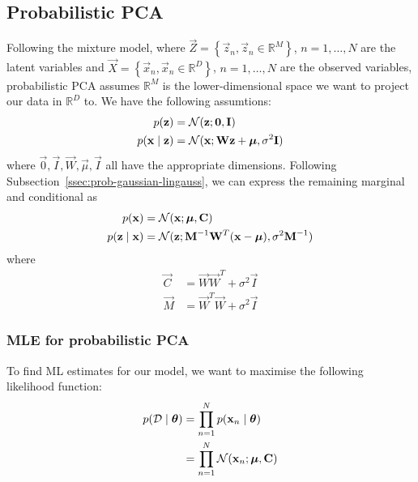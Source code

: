 \subsection{Probabilistic PCA}
Following the mixture model, where $\vec Z = \left\{\vec z_n, \vec z_n \in \mathbb R^M\right\}$, $n = 1, \dotsc, N$ are the latent variables and $\vec X = \left\{\vec x_n, \vec x_n \in \mathbb R^D\right\}$, $n = 1, \dotsc, N$ are the observed variables, probabilistic PCA assumes $\mathbb R^M$ is the lower-dimensional space we want to project our data in $\mathbb R^D$ to. We have the following assumtions:
\begin{align*}
    p(\boldsymbol{\mathbf{z}})               &= \operatorname{\mathcal N}(\boldsymbol{\mathbf{z}}; \boldsymbol{\mathbf{0}}, \boldsymbol{\mathbf{I}}) \\
    p(\boldsymbol{\mathbf{x}} \mid \boldsymbol{\mathbf{z}})   &= \operatorname{\mathcal N}(\boldsymbol{\mathbf{x}}; \boldsymbol{\mathbf{W}} \boldsymbol{\mathbf{z}} + \boldsymbol{\mathbf{\mu}}, \sigma^2 \boldsymbol{\mathbf{I}})
\end{align*}
where $\vec 0, \vec I, \vec W, \vec \mu, \vec I$ all have the appropriate dimensions. Following Subsection~\ref{ssec:prob-gaussian-lingauss}, we can express the remaining marginal and conditional as
\begin{align*}
    p(\boldsymbol{\mathbf{x}})               &= \operatorname{\mathcal N}(\boldsymbol{\mathbf{x}}; \boldsymbol{\mathbf{\mu}}, \boldsymbol{\mathbf{C}}) \\
    p(\boldsymbol{\mathbf{z}} \mid \boldsymbol{\mathbf{x}})   &= \operatorname{\mathcal N}(\boldsymbol{\mathbf{z}}; \boldsymbol{\mathbf{M}}^{-1} \boldsymbol{\mathbf{W}}^T (\boldsymbol{\mathbf{x}} - \boldsymbol{\mathbf{\mu}}), \sigma^2 \boldsymbol{\mathbf{M}}^{-1})
\end{align*}
where
\begin{align*}
    \vec C      &= \vec W \vec W^T + \sigma^2 \vec I \\
    \vec M      &= \vec W^T \vec W + \sigma^2 \vec I
\end{align*}

\subsubsection{MLE for probabilistic PCA}
To find ML estimates for our model, we want to maximise the following likelihood function:
\begin{align*}
    p(\mathcal D \mid \boldsymbol{\mathbf{\theta}})  &= \prod_{n = 1}^N p(\boldsymbol{\mathbf{x}}_n \mid \boldsymbol{\mathbf{\theta}}) \\
                                    &= \prod_{n = 1}^N \operatorname{\mathcal N}(\boldsymbol{\mathbf{x}}_n ; \boldsymbol{\mathbf{\mu}}, \boldsymbol{\mathbf{C}})
\end{align*}

